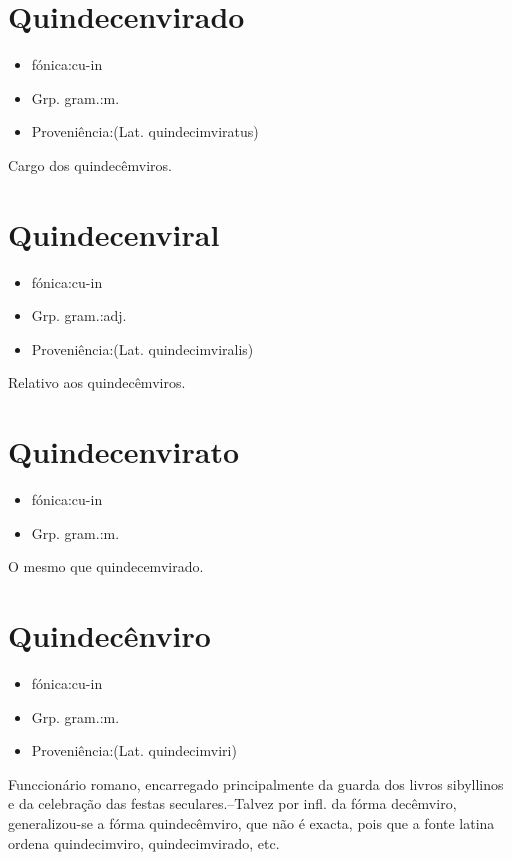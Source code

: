 \section{Quindecenvirado}
\begin{itemize}
\item {fónica:cu-in}
\end{itemize}
\begin{itemize}
\item {Grp. gram.:m.}
\end{itemize}
\begin{itemize}
\item {Proveniência:(Lat. \textunderscore quindecimviratus\textunderscore )}
\end{itemize}
Cargo dos quindecêmviros.
\section{Quindecenviral}
\begin{itemize}
\item {fónica:cu-in}
\end{itemize}
\begin{itemize}
\item {Grp. gram.:adj.}
\end{itemize}
\begin{itemize}
\item {Proveniência:(Lat. \textunderscore quindecimviralis\textunderscore )}
\end{itemize}
Relativo aos quindecêmviros.
\section{Quindecenvirato}
\begin{itemize}
\item {fónica:cu-in}
\end{itemize}
\begin{itemize}
\item {Grp. gram.:m.}
\end{itemize}
O mesmo que \textunderscore quindecemvirado\textunderscore .
\section{Quindecênviro}
\begin{itemize}
\item {fónica:cu-in}
\end{itemize}
\begin{itemize}
\item {Grp. gram.:m.}
\end{itemize}
\begin{itemize}
\item {Proveniência:(Lat. \textunderscore quindecimviri\textunderscore )}
\end{itemize}
Funccionário romano, encarregado principalmente da guarda dos livros sibyllinos e da celebração das festas seculares.--Talvez por infl. da fórma \textunderscore decêmviro\textunderscore , generalizou-se a fórma \textunderscore quindecêmviro\textunderscore , que não é exacta, pois que a fonte latina ordena \textunderscore quindecimviro\textunderscore , \textunderscore quindecimvirado\textunderscore , etc.
